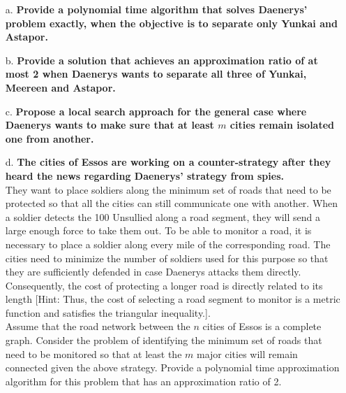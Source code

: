 \documentclass[11pt]{article}
\begin{document}
\begin{itemize}
\item[a.] \textbf{Provide a polynomial time algorithm that solves Daenerys'
  problem exactly, when the objective is to separate only Yunkai and
  Astapor.}

\item[b.] \textbf{Provide a solution that achieves an approximation ratio of
  at most 2 when Daenerys wants to separate all three of Yunkai,
  Meereen and Astapor.}
  
\item[c.] \textbf{Propose a local search approach for the general case where
  Daenerys wants to make sure that at least $m$ cities remain isolated
  one from another.}

\item[d.] \textbf{The cities of Essos are working on a counter-strategy after
  they heard the news regarding Daenerys' strategy from spies.} \\

 \noindent They want to place soldiers along the minimum set of roads
 that need to be protected so that all the cities can still
 communicate one with another. When a soldier detects the 100
 Unsullied along a road segment, they will send a large enough force
 to take them out. To be able to monitor a road, it is necessary to
 place a soldier along every mile of the corresponding road. The
 cities need to minimize the number of soldiers used for this purpose
 so that they are sufficiently defended in case Daenerys attacks them
 directly. Consequently, the cost of protecting a longer road is
 directly related to its length [Hint: Thus, the cost of selecting a
   road segment to monitor is a metric function and satisfies the
   triangular inequality.].\\

 \noindent Assume that the road network between the $n$ cities of
 Essos is a complete graph. Consider the problem of identifying the
 minimum set of roads that need to be monitored so that at least the
 $m$ major cities will remain connected given the above strategy.
 Provide a polynomial time approximation algorithm for this problem
 that has an approximation ratio of 2.

\end{itemize}
\end{document}
